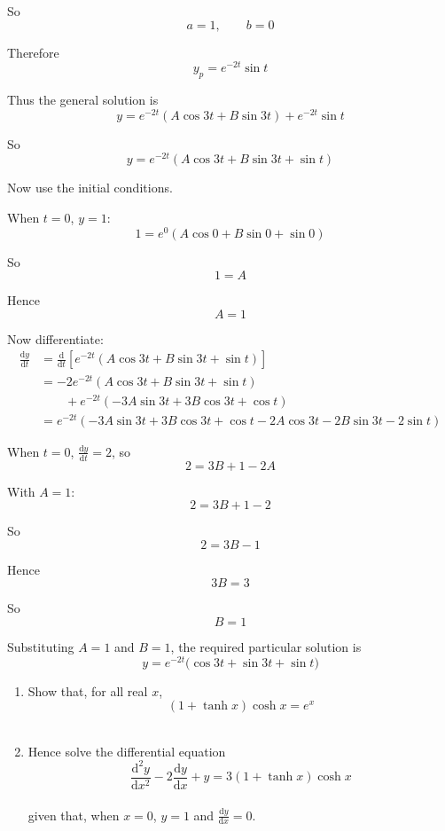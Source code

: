\documentclass[leqno]{article}
\begin{document}
\begin{enumerate}[
  label=\textbf{\arabic*.},
  leftmargin=*,
  topsep=0pt,
  partopsep=0pt,
  parsep=0pt
]
\begin{djsSolution}
So
\[
a=1, \qquad b=0
\]

Therefore
\[
y_p=e^{-2t}\sin t
\]

Thus the general solution is
\[
y=e^{-2t}\left(A\cos 3t+B\sin 3t\right)+e^{-2t}\sin t
\]

So
\[
y=e^{-2t}\left(A\cos 3t+B\sin 3t+\sin t\right)
\]

Now use the initial conditions.

When $t=0$, $y=1$:
\[
1=e^{0}\left(A\cos 0+B\sin 0+\sin 0\right)
\]

So
\[
1=A
\]

Hence
\[
A=1
\]

Now differentiate:
\begin{align*}
\frac{\mathrm{d}y}{\mathrm{d}t}
&= \frac{\mathrm{d}}{\mathrm{d}t}\left[e^{-2t}\left(A\cos 3t+B\sin 3t+\sin t\right)\right] \\
&= -2e^{-2t}\left(A\cos 3t+B\sin 3t+\sin t\right) \\
&\qquad +e^{-2t}\left(-3A\sin 3t+3B\cos 3t+\cos t\right) \\
&= e^{-2t}\left(-3A\sin 3t+3B\cos 3t+\cos t-2A\cos 3t-2B\sin 3t-2\sin t\right)
\end{align*}

When $t=0$, $\frac{\mathrm{d}y}{\mathrm{d}t}=2$, so
\[
2=3B+1-2A
\]

With $A=1$:
\[
2=3B+1-2
\]

So
\[
2=3B-1
\]

Hence
\[
3B=3
\]

So
\[
B=1
\]

Substituting $A=1$ and $B=1$, the required particular solution is
\[
y=e^{-2t}\bigl(\cos 3t+\sin 3t+\sin t\bigr)
\]
\end{djsSolution}


\newpage

\questionitem

\begin{enumerate}[label=\textbf{(\alph*)}]
  \item Show that, for all real $x$, \\
  \[
  (1+\tanh x)\cosh x = e^{x}
  \]
   \\
  \item Hence solve the differential equation \\
  \[
  \frac{\mathrm{d}^2 y}{\mathrm{d}x^2} - 2\frac{\mathrm{d}y}{\mathrm{d}x} + y = 3(1+\tanh x)\cosh x
  \]\\
  given that, when $x=0$, $y=1$ and $\frac{\mathrm{d}y}{\mathrm{d}x}=0$.  \\
\end{enumerate}


\end{enumerate}
\end{document}
